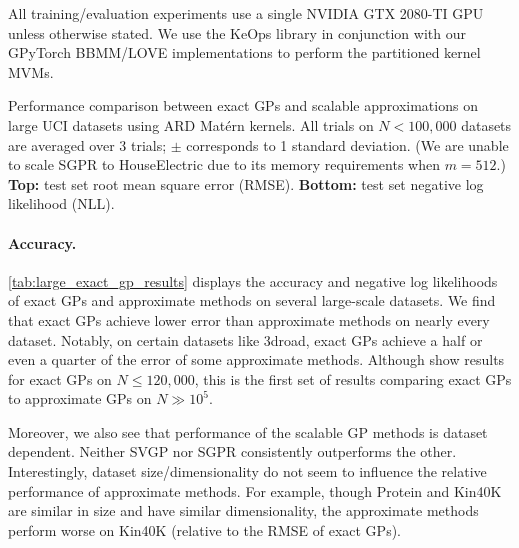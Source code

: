 All training/evaluation experiments use a single NVIDIA GTX 2080-TI GPU unless otherwise stated.
We use the KeOps library \cite{charlier2020kernel} in conjunction with our GPyTorch BBMM/LOVE implementations to perform the partitioned kernel MVMs.

\begin{table}[!tb]
  \caption[Performance comparison between exact GPs and scalable approximations on large UCI datasets.]{
    Performance comparison between exact GPs and scalable approximations on large UCI datasets using ARD Mat\'ern kernels.
    All trials on $N < 100,\!000$ datasets are averaged over 3 trials; $\pm$ corresponds to 1 standard deviation.
    (We are unable to scale SGPR to HouseElectric due to its memory requirements when $m=512$.)
    {\bf Top:} test set root mean square error (RMSE).
    {\bf Bottom:} test set negative log likelihood (NLL).
  }
  \label{tab:large_exact_gp_results}
  \centering
  \vspace{1em}

  \resizebox{\textwidth}{!}{%
    
  }
  \vspace{1em}

  \resizebox{\textwidth}{!}{%
    
  }
  \vspace{1em}
\end{table}

\paragraph{Accuracy.}
\cref{tab:large_exact_gp_results} displays the accuracy and negative log likelihoods of exact GPs and approximate methods on several large-scale datasets.
We find that exact GPs achieve lower error than approximate methods on nearly every dataset.
Notably, on certain datasets like 3droad, exact GPs achieve a half or even a quarter of the error of some approximate methods.
Although \citet{nguyen2019exact} show results for exact GPs on $N \leq 120,\!000$, this is the first set of results comparing exact GPs to approximate GPs on $N\gg 10^5$.

Moreover, we also see that performance of the scalable GP methods is dataset dependent.
Neither SVGP nor SGPR consistently outperforms the other.
Interestingly, dataset size/dimensionality do not seem to influence the relative performance of approximate methods.
For example, though Protein and Kin40K are similar in size and have similar dimensionality, the approximate methods perform worse on Kin40K (relative to the RMSE of exact GPs).

